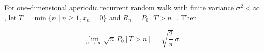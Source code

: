 For one-dimensional aperiodic recurrent random walk with finite variance $\sigma^2 < \infty$, let $T = \min\{n \mid n \geq 1, x_n = 0\}$ and $R_n = P_0[T > n]$. Then

$$\lim_{n \to \infty} \sqrt{n} \, P_0[T > n] = \sqrt{\frac{2}{\pi}} \, \sigma.$$
